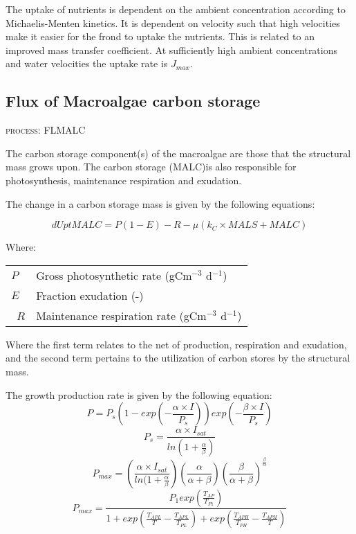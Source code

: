\documentclass{deltares_manual}
\begin{document}
The uptake of nutrients is dependent on the ambient concentration according to Michaelis-Menten kinetics. It is dependent on velocity such that high velocities make it easier for the frond to uptake the nutrients. This is related to an improved mass transfer coefficient. At sufficiently high ambient concentrations and water velocities the uptake rate is $J_{max}$.

\subsection{Flux of Macroalgae carbon storage}
\begin{flushright}
\textsc{process: FLMALC}
\end{flushright}

The carbon storage component(s) of the macroalgae are those that the structural mass grows upon. The carbon storage (MALC)is also responsible for photosynthesis, maintenance respiration and exudation. 

The change in a carbon storage mass is given by the following equations:

\[dUptMALC = P(1-E)-R - \mu(k_C \times MALS + MALC)\]

Where:
\begin{tabular}{ll}
$P$ & Gross photosynthetic rate (gCm$^{-3}$ d$^{-1}$)\\
$E$ & Fraction exudation (-)\\\
$R$ & Maintenance respiration rate (gCm$^{-3}$ d$^{-1}$)\\
\end{tabular}

Where the first term relates to the net of production, respiration and exudation, and the second term pertains to the utilization of carbon stores by the structural mass.

The growth production rate is given by the following equation:
\[P = P_s(1-exp(-\frac{\alpha \times I}{P_s}))exp(-\frac{\beta \times I}{P_s})\]
\[P_s = \frac{\alpha \times I_{sat}}{ln(1+\frac{\alpha}{\beta})}\]
\[P_{max} = (\frac{\alpha \times I_{sat}}{ln(1+\frac{\alpha}{\beta}})(\frac{\alpha}{\alpha+\beta})(\frac{\beta}{\alpha+\beta})^{\frac{\beta}{\alpha}}\]
\[P_{max} = \frac{P_1exp(\frac{T_{AP}}{T_{P1}})}{1+exp(\frac{T_{APL}}{T} - \frac{T_{APL}}{T_{PL}})+exp(\frac{T_{APH}}{T_{PH}}-\frac{T_{APH}}{T})}\]
\end{document}
